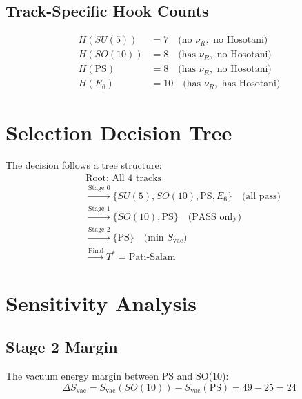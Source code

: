 \documentclass[11pt,a4paper]{article}
\begin{document}
\subsection{Track-Specific Hook Counts}
\label{app:track-hooks}

\begin{align}
\label{eq:hooks-su5}
H(SU(5)) &= 7 \quad \text{(no } \nu_R, \text{ no Hosotani)} \\
\label{eq:hooks-so10}
H(SO(10)) &= 8 \quad \text{(has } \nu_R, \text{ no Hosotani)} \\
\label{eq:hooks-ps}
H(\text{PS}) &= 8 \quad \text{(has } \nu_R, \text{ no Hosotani)} \\
\label{eq:hooks-e6}
H(E_6) &= 10 \quad \text{(has } \nu_R, \text{ has Hosotani)}
\end{align}

\section{Selection Decision Tree}
\label{app:decision-tree}

The decision follows a tree structure:
\begin{align}
\label{eq:tree-root}
&\text{Root: All 4 tracks} \\
\label{eq:tree-s0}
&\xrightarrow{\text{Stage 0}} \{SU(5), SO(10), \text{PS}, E_6\} \quad \text{(all pass)} \\
\label{eq:tree-s1}
&\xrightarrow{\text{Stage 1}} \{SO(10), \text{PS}\} \quad \text{(PASS only)} \\
\label{eq:tree-s2}
&\xrightarrow{\text{Stage 2}} \{\text{PS}\} \quad \text{(min } S_{\text{vac}}\text{)} \\
\label{eq:tree-final}
&\xrightarrow{\text{Final}} T^* = \text{Pati-Salam}
\end{align}

\section{Sensitivity Analysis}
\label{app:sensitivity}

\subsection{Stage 2 Margin}
\label{app:s2-margin}

The vacuum energy margin between PS and SO(10):
\begin{equation}
\label{eq:margin-s2}
\Delta S_{\text{vac}} = S_{\text{vac}}(SO(10)) - S_{\text{vac}}(\text{PS}) = 49 - 25 = 24
\end{equation}
\end{document}

